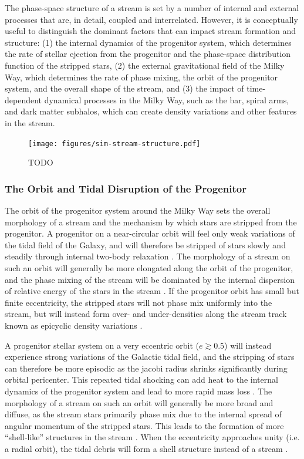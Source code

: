 \documentclass[final,5p,times,twocolumn,authoryear]{elsarticle}
\begin{document}
The phase-space structure of a stream is set by a number of internal and external
processes that are, in detail, coupled and interrelated.
However, it is conceptually useful to distinguish the dominant factors that can impact
stream formation and structure:
(1) the internal dynamics of the progenitor system, which determines the rate of stellar
ejection from the progenitor and the phase-space distribution function of the stripped
stars,
(2) the external gravitational field of the Milky Way, which determines the rate of
phase mixing, the orbit of the progenitor system, and the overall shape of the stream,
and
(3) the impact of time-dependent dynamical processes in the Milky Way, such as the bar,
spiral arms, and dark matter subhalos, which can create density variations and other
features in the stream.

\begin{figure}[t!]
    \centering
    \texttt{[image: figures/sim-stream-structure.pdf]}
    \caption{
        TODO
        \label{fig:sim-streams}
    }
\end{figure}

\subsubsection{The Orbit and Tidal Disruption of the Progenitor}

The orbit of the progenitor system around the Milky Way sets the overall morphology of a
stream and the mechanism by which stars are stripped from the progenitor.
A progenitor on a near-circular orbit will feel only weak variations of the tidal field
of the Galaxy, and will therefore be stripped of stars slowly and steadily through
internal two-body relaxation \citep[e.g.,][]{kupper:2010}.
The morphology of a stream on such an orbit will generally be more elongated along the
orbit of the progenitor, and the phase mixing of the stream will be dominated by the
internal dispersion of relative energy of the stars in the stream
\citep[e.g.,][]{hendel:2015}.
If the progenitor orbit has small but finite eccentricity, the stripped stars will not
phase mix uniformly into the stream, but will instead form over- and under-densities
along the stream track known as epicyclic density variations \citep{kupper:2010}.

A progenitor stellar system on a very eccentric orbit ($e \gtrsim 0.5$) will instead
experience strong variations of the Galactic tidal field, and the stripping of stars can
therefore be more episodic as the jacobi radius shrinks significantly during orbital
pericenter.
This repeated tidal shocking can add heat to the internal dynamics of the progenitor
system and lead to more rapid mass loss \citep[e.g.,][]{gnedin:1999}.
The morphology of a stream on such an orbit will generally be more broad and diffuse, as
the stream stars primarily phase mix due to the internal spread of angular momentum of
the stripped stars.
This leads to the formation of more ``shell-like'' structures in the stream
\citep[e.g.,][]{hendel:2015}.
When the eccentricity approaches unity (i.e. a radial orbit), the tidal debris will form
a shell structure instead of a stream \citep[e.g.,][]{hernquist:1987, sanderson:2013}.
\end{document}

